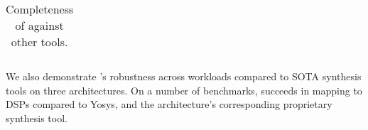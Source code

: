 \begin{table}
    \centering
    \begin{tabular}{c|c}
    \end{tabular}
    \caption{Completeness of \lr against other tools.}
    \label{tab:mylabel}
\end{table}

We also demonstrate \lr's robustness across workloads
  compared to SOTA synthesis tools on three architectures. 
On a number of benchmarks, \lr succeeds in mapping 
  to DSPs compared to Yosys, and the architecture's corresponding proprietary synthesis tool.

%
%
%
%  
%
